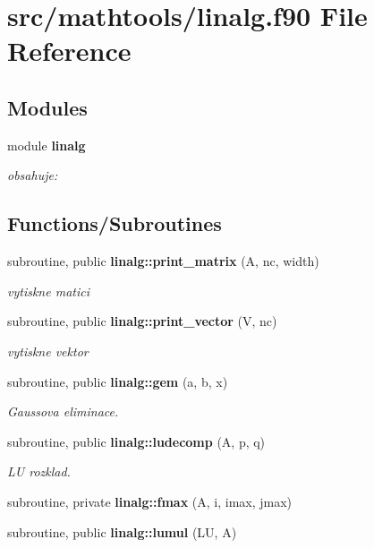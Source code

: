 \section{src/mathtools/linalg.f90 File Reference}
\label{linalg_8f90}
\subsection*{Modules}
\begin{DoxyCompactItemize}
\item 
module {\bf linalg}
\begin{DoxyCompactList}\small\item\em obsahuje\+: \end{DoxyCompactList}\end{DoxyCompactItemize}
\subsection*{Functions/\+Subroutines}
\begin{DoxyCompactItemize}
\item 
subroutine, public {\bf linalg\+::print\+\_\+matrix} (A, nc, width)
\begin{DoxyCompactList}\small\item\em vytiskne matici \end{DoxyCompactList}\item 
subroutine, public {\bf linalg\+::print\+\_\+vector} (V, nc)
\begin{DoxyCompactList}\small\item\em vytiskne vektor \end{DoxyCompactList}\item 
subroutine, public {\bf linalg\+::gem} (a, b, x)
\begin{DoxyCompactList}\small\item\em Gaussova eliminace. \end{DoxyCompactList}\item 
subroutine, public {\bf linalg\+::ludecomp} (A, p, q)
\begin{DoxyCompactList}\small\item\em LU rozklad. \end{DoxyCompactList}\item 
subroutine, private {\bf linalg\+::fmax} (A, i, imax, jmax)
\item 
subroutine, public {\bf linalg\+::lumul} (LU, A)
\end{DoxyCompactItemize}
